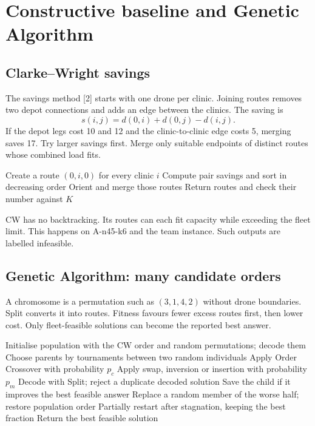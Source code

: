 \section{Constructive baseline and Genetic Algorithm}
\subsection*{Clarke--Wright savings}
The savings method [2] starts with one drone per clinic. Joining routes removes two depot connections and adds an
edge between the clinics. The saving is
\[
 s(i,j)=d(0,i)+d(0,j)-d(i,j).
\]
If the depot legs cost 10 and 12 and the clinic-to-clinic edge costs 5, merging saves 17.
Try larger savings first. Merge only suitable endpoints of distinct routes whose combined load fits.

\begin{algorithm}[h]\caption{Clarke--Wright baseline (\texttt{savings.cpp})}
\begin{algorithmic}[1]
\State Create a route $(0,i,0)$ for every clinic $i$
\State Compute pair savings and sort in decreasing order
  \State Orient and merge those routes
 \EndIf
\EndFor
\State Return routes and check their number against $K$
\end{algorithmic}\end{algorithm}

CW has no backtracking. Its routes can each fit capacity while exceeding the fleet limit.
This happens on A-n45-k6 and the team instance. Such outputs are labelled infeasible.

\subsection*{Genetic Algorithm: many candidate orders}
A chromosome is a permutation such as $(3,1,4,2)$ without drone boundaries. Split converts it
into routes. Fitness favours fewer excess routes first, then lower cost. Only fleet-feasible
solutions can become the reported best answer.

\begin{algorithm}[h]\caption{Steady-state GA (\texttt{ga.cpp})}
\begin{algorithmic}[1]
\State Initialise population with the CW order and random permutations; decode them
  \State Choose parents by tournaments between two random individuals
  \State Apply Order Crossover with probability $p_c$
  \State Apply swap, inversion or insertion with probability $p_m$
  \State Decode with Split; reject a duplicate decoded solution
  \State Save the child if it improves the best feasible answer
  \State Replace a random member of the worse half; restore population order
 \EndFor
 \State Partially restart after stagnation, keeping the best fraction
\EndWhile
\State Return the best feasible solution
\end{algorithmic}\end{algorithm}

